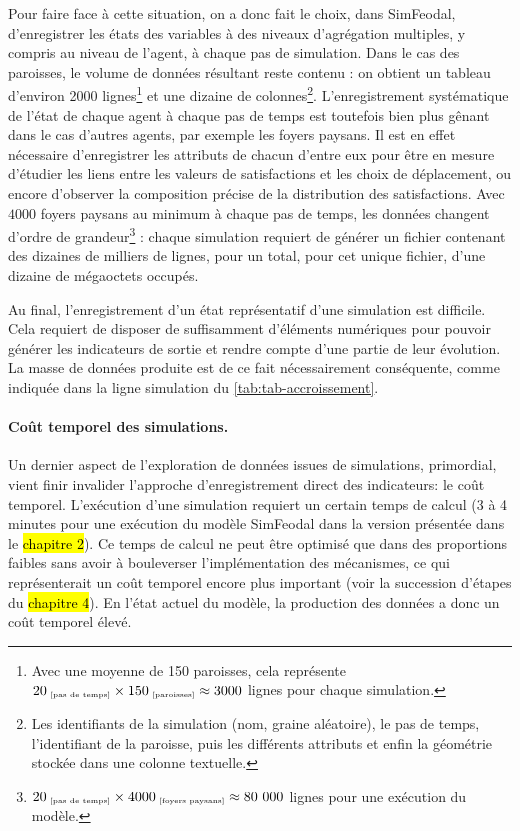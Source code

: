 Pour faire face à cette situation, on a donc fait le choix, dans SimFeodal, d'enregistrer les états des variables à des niveaux d'agrégation multiples, y compris au niveau de l'agent, à chaque pas de simulation.
Dans le cas des paroisses, le volume de données résultant reste contenu : on obtient un tableau d'environ 2000 lignes\footnote{
	Avec une moyenne de 150 paroisses, cela représente $20_{\text{\tiny ~[pas de temps]}} \times 150_{\text{\tiny ~[paroisses]}} \approx 3000$ lignes pour chaque simulation.
} et une dizaine de colonnes\footnote{
	Les identifiants de la simulation (nom, graine aléatoire), le pas de temps, l'identifiant de la paroisse, puis les différents attributs et enfin la géométrie stockée dans une colonne textuelle.
}.
L'enregistrement systématique de l'état de chaque agent à chaque pas de temps est toutefois bien plus gênant dans le cas d'autres agents, par exemple les foyers paysans.
Il est en effet nécessaire d'enregistrer les attributs de chacun d'entre eux pour être en mesure d'étudier les liens entre les valeurs de satisfactions et les choix de déplacement, ou encore d'observer la composition précise de la distribution des satisfactions. 
Avec $4000$ foyers paysans au minimum à chaque pas de temps, les données changent d'ordre de grandeur\footnote{
	$20_{\text{\tiny ~[pas de temps]}} \times 4000_{\text{\tiny ~[foyers paysans]}} \approx 80~000$ lignes pour une exécution du modèle.
} : chaque simulation requiert de générer un fichier contenant des dizaines de milliers de lignes, pour un total, pour cet unique fichier, d'une dizaine de mégaoctets occupés.

Au final, l'enregistrement d'un état représentatif d'une simulation est difficile.
Cela requiert de disposer de suffisamment d'éléments numériques pour pouvoir générer les indicateurs de sortie et rendre compte d'une partie de leur évolution.
La masse de données produite est de ce fait nécessairement conséquente, comme indiquée dans la ligne \og simulation\fg{} du \cref{tab:tab-accroissement}.

\paragraph{Coût temporel des simulations.}
Un dernier aspect de l'exploration de données issues de simulations, primordial, vient finir invalider l'approche d'enregistrement direct des indicateurs: le coût temporel.
L'exécution d'une simulation requiert un certain temps de calcul (3 à 4 minutes pour une exécution du modèle SimFeodal dans la version présentée dans le \hl{chapitre 2}).
Ce temps de calcul ne peut être optimisé que dans des proportions faibles sans avoir à bouleverser l'implémentation des mécanismes, ce qui représenterait un coût temporel encore plus important (voir la succession d'étapes du \hl{chapitre 4}).
En l'état actuel du modèle, la production des données a donc un coût temporel élevé.

